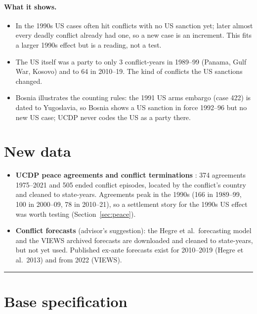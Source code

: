 \documentclass[11pt,a4paper]{article}
\newcommand{\parttitle}[1]{\vspace{1.2em}\noindent{\Large\bfseries #1}\par\vspace{0.3em}\hrule\vspace{0.6em}}
\begin{document}
\paragraph{What it shows.}
\begin{itemize}[leftmargin=*]
\item In the 1990s US cases often hit conflicts with no US sanction yet; later almost every deadly conflict already
  had one, so a new case is an increment. This fits a larger 1990s effect but is a reading, not a test.
\item The US itself was a party to only 3 conflict-years in 1989--99 (Panama, Gulf War, Kosovo) and to 64 in
  2010--19. The kind of conflicts the US sanctions changed.
\item Bosnia illustrates the counting rules: the 1991 US arms embargo (case 422) is dated to Yugoslavia, so Bosnia
  shows a US sanction in force 1992--96 but no new US case; UCDP never codes the US as a party there.
\end{itemize}

\section{New data}

\begin{itemize}[leftmargin=*]
\item \textbf{UCDP peace agreements and conflict terminations}
  \citep{ucdppeace2022,kreutz2010}: 374 agreements 1975--2021 and 505 ended conflict episodes, located by the
  conflict's country and cleaned to state-years. Agreements peak in the 1990s (166 in 1989--99, 100 in 2000--09, 78 in
  2010--21), so a settlement story for the 1990s US effect was worth testing (Section~\ref{sec:peace}).
\item \textbf{Conflict forecasts} (advisor's suggestion): the Hegre et al.\ forecasting model and the VIEWS archived
  forecasts are downloaded and cleaned to state-years, but not yet used. Published ex-ante forecasts exist for
  2010--2019 (Hegre et al.\ 2013) and from 2022 (VIEWS).
\end{itemize}

\parttitle{Part B --- The effect of US sanctions}

\section{Base specification}
\label{sec:base}
\end{document}
